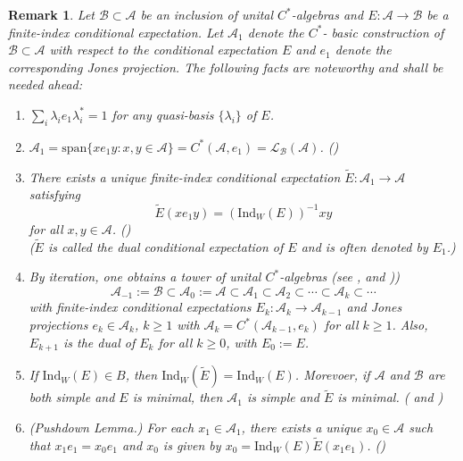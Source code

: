 \documentclass{amsart}
\numberwithin{equation}{section}
\newcommand{\Ind}{\mathrm{Ind}}
\newcommand{\1}{\mathbf{1}}
\newcommand{\mA}{\mathcal{A}}
\newcommand{\mB}{\mathcal{B}}
\newtheorem{remark}[theorem]{Remark}
\begin{document}
\begin{remark}\label{Dual-exp} \label{A1=span}
  Let $\mB\subset \mA$ be an inclusion of unital $C^*$-algebras and
  $E: \mA\rightarrow \mB$ be a finite-index conditional
  expectation. Let $\mA_1$ denote the $C^*$- basic construction of
  $\mB\subset \mA$ with respect to the conditional expectation $E$ and
  $e_1$ denote the corresponding Jones projection. The following facts
  are noteworthy and shall be needed ahead:
  \begin{enumerate}
\item $\sum_i \lambda_i e_1 \lambda_i^* = 1$ for any quasi-basis $\{\lambda_i\}$ of $E$.
  \item\(
\mA_1 = \mathrm{span}\{x e_1 y : x, y \in \mA\} =
C^*(\mA, e_1) = \mathcal{L}_{\mB}(\mA)\). \hfill (\cite[Proposition 1.3.3]{Wat})
  \item There exists a unique finite-index
  conditional expectation $\widetilde{E}: \mA_1 \rightarrow \mA$ satisfying
\[
\widetilde{E}(x e_1 y)= (\Ind_W(E))^{-1}xy
\]
for all $x, y \in \mA$.  \hspace{0.3cm}(\cite[Proposition
  1.6.1]{Wat})\\ ($\widetilde{E}$ is called the dual conditional
expectation of $E$ and is often  denoted by $E_1$.) 
 
\item By iteration, one obtains a tower of unital
  $C^*$-algebras  (see \cite[$\S 3.1$]{JOPT}, \cite[Proposition 3.18]{KAW} and
  \cite[$\S 2.3$]{BG}))
\[
\mA_{-1}:=\mB \subset \mA_0:=\mA \subset \mA_1 \subset \mA_2 \subset \cdots \subset
\mA_k \subset \cdots 
  \]
with finite-index conditional expectations $E_k : \mA_k \to
\mA_{k-1}$ and Jones projections $e_k \in \mA_k$, $k \geq
1$ with $\mA_{k} = C^*(\mA_{k-1} , e_k)$ for all $k \geq
1$. Also, $E_{k+1}$ is the dual of $E_k$ for all $k \geq 0$, with $E_0:= E$.

\item If $\Ind_W(E ) \in B$, then $ \Ind_W(\widetilde{E
})= \Ind_W(E ) $. Morevoer, if $\mA$ and $\mB$ are both simple and $E$ is minimal,
  then $\mA_1$ is simple and $\widetilde{E}$ is
  minimal. (\cite[Cor. 2.2.14, Prop. 2.3.4]{Wat} and \cite[Cor.
    3.4]{KAW})

\item (Pushdown Lemma.) For each $x_1\in \mA_1$, there exists a unique $x_0\in\mA$
 such that $x_1e_1= x_{0}e_1$ and $x_0$ is given by $x_0 = \Ind_{W}(E)
 \widetilde{E}(x_1 e_1)$. \hfill \hspace{0.3cm}(\cite[Lemma 3.7]{JOPT})
  \end{enumerate}
  \end{remark}
\end{document}
